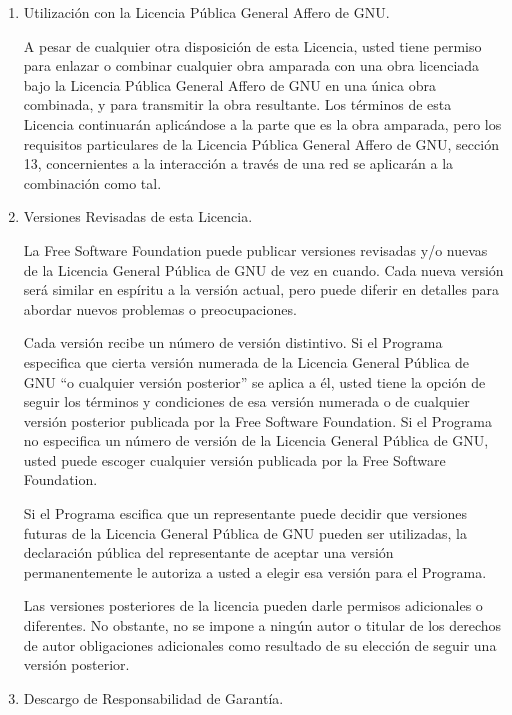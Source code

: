 \documentclass[11pt]{article}
\begin{document}
\begin{enumerate}
\item Utilizaci\'{o}n con la Licencia P\'{u}blica General Affero de GNU.

A pesar de cualquier otra disposici\'{o}n de esta Licencia, usted tiene
permiso para enlazar o combinar cualquier obra amparada con una obra 
licenciada bajo la Licencia P\'{u}blica General Affero de GNU en una \'{u}nica obra 
combinada, y para transmitir la obra resultante. Los t\'{e}rminos de esta 
Licencia continuar\'{a}n aplic\'{a}ndose a la parte que es la obra amparada, pero 
los requisitos particulares de la Licencia P\'{u}blica General Affero de GNU, 
secci\'{o}n 13, concernientes a la interacci\'{o}n a trav\'{e}s de una red se aplicar\'{a}n 
a la combinaci\'{o}n como tal.

\item Versiones Revisadas de esta Licencia.

La Free Software Foundation puede publicar versiones revisadas y/o nuevas 
de la Licencia General P\'{u}blica de GNU de vez en cuando. Cada nueva versi\'{o}n 
ser\'{a} similar en esp\'{i}ritu a la versi\'{o}n actual, pero puede diferir en 
detalles para abordar nuevos problemas o preocupaciones.

Cada versi\'{o}n recibe un n\'{u}mero de versi\'{o}n distintivo. Si el Programa 
especifica que cierta versi\'{o}n numerada de la Licencia General P\'{u}blica de 
GNU ``o cualquier versi\'{o}n posterior'' se aplica a \'{e}l, usted tiene la opci\'{o}n 
de seguir los t\'{e}rminos y condiciones de esa versi\'{o}n numerada o de cualquier 
versi\'{o}n posterior publicada por la Free Software Foundation. Si el Programa 
no especifica un n\'{u}mero de versi\'{o}n de la Licencia General P\'{u}blica de GNU, 
usted puede escoger cualquier versi\'{o}n publicada por la Free Software 
Foundation.

Si el Programa escifica que un representante puede decidir que versiones 
futuras de la Licencia General P\'{u}blica de GNU pueden ser utilizadas, la 
declaraci\'{o}n p\'{u}blica del representante de aceptar una versi\'{o}n permanentemente 
le autoriza a usted a elegir esa versi\'{o}n para el Programa.

Las versiones posteriores de la licencia pueden darle permisos adicionales 
o diferentes. No obstante, no se impone a ning\'{u}n autor o titular de los 
derechos de autor obligaciones adicionales como resultado de su elecci\'{o}n de 
seguir una versi\'{o}n posterior.

\item Descargo de Responsabilidad de Garant\'{i}a.


\end{enumerate}
\end{document}
